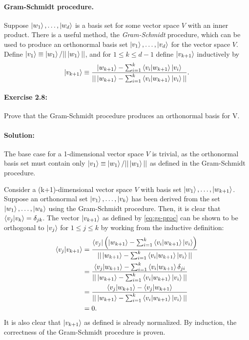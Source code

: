 \documentclass{article}
\begin{document}
\paragraph{Gram-Schmidt procedure.} Suppose $\ket{w_1}, \ldots, \ket{w_d}$ is a basis set for some vector space $V$ with an inner product. There is a useful method, the \emph{Gram-Schmidt} procedure, which can be used to produce an orthonormal basis set $\ket{v_1}, \ldots, \ket{v_d}$ for the vector space $V$. Define $\ket{v_1} \equiv \ket{w_1}/||\ket{w_1}||$, and for $1 \leq k \leq d - 1$ define $\ket{v_{k+1}}$ inductively by \begin{equation} \label{eq:gs-proc}
  \ket{v_{k+1}} \equiv \frac{\ket{w_{k+1}} - \sum_{i=1}^k \braket{v_i}{w_{k+1}}\ket{v_i}}{||\ket{w_{k+1}} - \sum_{i=1}^k \braket{v_i}{w_{k+1}}\ket{v_i}||}.
\end{equation}

\paragraph{\cite{mikeandike} Exercise 2.8:} Prove that the Gram-Schmidt procedure produces an orthonormal basis for V.

\paragraph{Solution:} The base case for a 1-dimensional vector space $V$ is trivial, as the orthonormal basis set must contain only $\ket{v_1} \equiv \ket{w_1}/||\ket{w_1}||$ as defined in the Gram-Schmidt procedure.

Consider a (k+1)-dimensional vector space $V$ with basis set $\ket{w_1}, \ldots, \ket{w_{k+1}}$. Suppose an orthonormal set $\ket{v_1}, \ldots, \ket{v_k}$ has been derived from the set $\ket{w_1}, \ldots, \ket{w_k}$ using the Gram-Schmidt procedure. Then, it is clear that $\braket{v_j}{v_k} = \delta_{jk}$. The vector $\ket{v_{k+1}}$ as defined by \eqref{eq:gs-proc} can be shown to be orthogonal to $\ket{v_j}$ for $1 \leq j \leq k$ by working from the inductive definition: \begin{align*}
  \braket{v_j}{v_{k+1}} &= \frac{\bra{v_j} \left(\ket{w_{k+1}} - \sum_{i=1}^k \braket{v_i}{w_{k+1}}\ket{v_i}\right)}{||\ket{w_{k+1}} - \sum_{i=1}^k \braket{v_i}{w_{k+1}}\ket{v_i}||} \\
    &= \frac{\braket{v_j}{w_{k+1}} - \sum_{i=1}^k \braket{v_i}{w_{k+1}}\delta_{ji}}{||\ket{w_{k+1}} - \sum_{i=1}^k \braket{v_i}{w_{k+1}}\ket{v_i}||} \\
    &= \frac{\braket{v_j}{w_{k+1}} - \braket{v_j}{w_{k+1}}}{||\ket{w_{k+1}} - \sum_{i=1}^k \braket{v_i}{w_{k+1}}\ket{v_i}||} \\
    &= 0.
\end{align*}
It is also clear that $\ket{v_{k+1}}$ as defined is already normalized. By induction, the correctness of the Gram-Schmidt procedure is proven.
\end{document}
